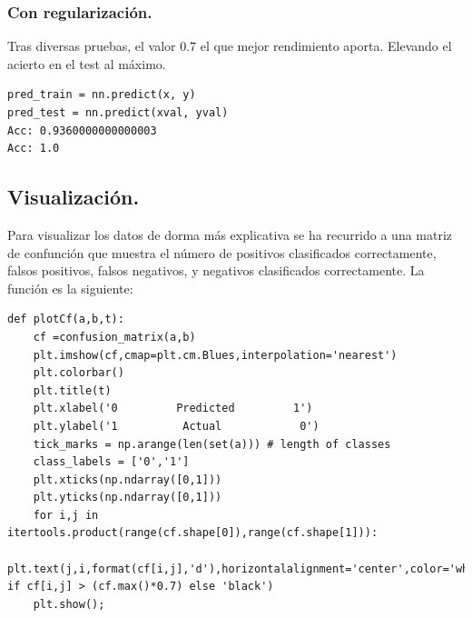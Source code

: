 \documentclass[a4paper,10pt]{article}
\begin{document}
\subsubsection{Con regularización.}
Tras diversas pruebas, el valor 0.7 el que mejor rendimiento aporta. Elevando el acierto en el test al máximo.
\begin{lstlisting}
pred_train = nn.predict(x, y)
pred_test = nn.predict(xval, yval)
Acc: 0.9360000000000003
Acc: 1.0
\end{lstlisting}
\subsection{Visualización.}
Para visualizar los datos de dorma más explicativa se ha recurrido a una matriz de confunción que muestra el número de positivos clasificados correctamente, falsos positivos, falsos negativos, y  negativos clasificados correctamente. La función es la siguiente:
\begin{lstlisting}
def plotCf(a,b,t):
    cf =confusion_matrix(a,b)
    plt.imshow(cf,cmap=plt.cm.Blues,interpolation='nearest')
    plt.colorbar()
    plt.title(t)
    plt.xlabel('0         Predicted         1')
    plt.ylabel('1          Actual            0')
    tick_marks = np.arange(len(set(a))) # length of classes
    class_labels = ['0','1']
    plt.xticks(np.ndarray([0,1]))
    plt.yticks(np.ndarray([0,1]))
    for i,j in itertools.product(range(cf.shape[0]),range(cf.shape[1])):
        plt.text(j,i,format(cf[i,j],'d'),horizontalalignment='center',color='white' if cf[i,j] > (cf.max()*0.7) else 'black')
    plt.show();
\end{lstlisting}
\end{document}
